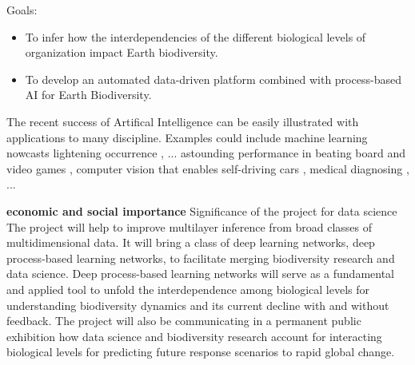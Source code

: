 \documentclass[authoryear,1p,12pt]{elsarticle}
\begin{document}
     Goals:
     \begin{itemize}
     \item To infer how the interdependencies of the different
       biological levels of organization impact Earth biodiversity.
     \item To develop an automated data-driven platform combined with
       process-based AI for Earth Biodiversity.
     \end{itemize}

     \cite{Webb2018,Heaven2019} The recent success of Artifical
     Intelligence can be easily illustrated with applications to many
     discipline. Examples could include machine learning nowcasts
     lightening occurrence \cite{Mostajabi2019}, ...  astounding
     performance in beating board and video games
     \cite{Mnih2015,Silver2016}, computer vision that enables
     self-driving cars \cite{Poggio2004,Krizhevsky2012}, medical
     diagnosing \cite{Ferrucci2013}, ...

     \newpage
     {\bf economic and social importance} Significance of the project
     for data science The project will help to improve multilayer
     inference from broad classes of multidimensional data. It will
     bring a class of deep learning networks, deep process-based
     learning networks, to facilitate merging biodiversity research
     and data science. Deep process-based learning networks will serve
     as a fundamental and applied tool to unfold the interdependence
     among biological levels for understanding biodiversity dynamics
     and its current decline with and without feedback. The project
     will also be communicating in a permanent public exhibition how
     data science and biodiversity research account for interacting
     biological levels for predicting future response scenarios to
     rapid global change.

     
     \newpage
\end{document}
